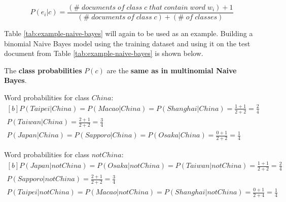 \documentclass{article}
\begin{document}
\begin{equation}
	P(e_i|c) = \frac{(\#\;documents\;of\;class\;c\;that\;contain\;word\;w_i) + 1}{(\#\;documents\;of\;class\;c) + (\#\;of\;classes)}	
	\label{eq:binomial-word-existence-prob}
\end{equation}

Table \ref{tab:example-naive-bayes} will again to be used as an example. Building a binomial Naive Bayes model using the training dataset and using it on the test document from Table \ref{tab:example-naive-bayes} is shown below.

The \textbf{class probabilities} $P(c)$ are the \textbf{same as in multinomial Naive Bayes}.

Word probabilities for class $China$:
\begin{equation}
\begin{aligned}[b]
P(Taipei|China) = P(Macao|China) = P(Shanghai|China) = \frac{1 + 1}{2 + 2} = \frac{2}{4} \\
P(Taiwan|China) = \frac{2 + 1}{2 + 2} = \frac{3}{4} \\
P(Japan|China) = P(Sapporo|China) = P(Osaka|China) = \frac{0 + 1}{2 + 2} = \frac{1}{4}
\end{aligned}
\end{equation}

Word probabilities for class $notChina$:
\begin{equation}
\begin{aligned}[b]
P(Japan|notChina) = P(Osaka|notChina) = P(Taiwan|notChina) = \frac{1 + 1}{2 + 2} = \frac{2}{4} \\
P(Sapporo|notChina) = \frac{2 + 1}{2 + 2} = \frac{3}{4} \\
P(Taipei|notChina) = P(Macao|notChina) = P(Shanghai|notChina) = \frac{0 + 1}{2 + 4} = \frac{1}{4}
\end{aligned}
\end{equation}
\end{document}
